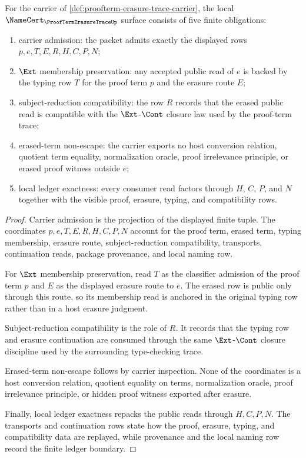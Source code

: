 \begin{theorem}
\label{thm:proofterm-erasure-trace-namecert-obligations}
For the carrier of \autoref{def:proofterm-erasure-trace-carrier}, the local $\NameCert_{\ProofTermErasureTraceUp}$ surface consists of five finite obligations:
\begin{enumerate}
\item carrier admission: the packet admits exactly the displayed rows $p,e,T,E,R,H,C,P,N$;
\item $\Ext$ membership preservation: any accepted public read of $e$ is backed by the typing row $T$ for the proof term $p$ and the erasure route $E$;
\item subject-reduction compatibility: the row $R$ records that the erased public read is compatible with the $\Ext$-$\Cont$ closure law used by the proof-term trace;
\item erased-term non-escape: the carrier exports no host conversion relation, quotient term equality, normalization oracle, proof irrelevance principle, or erased proof witness outside $e$;
\item local ledger exactness: every consumer read factors through $H$, $C$, $P$, and $N$ together with the visible proof, erasure, typing, and compatibility rows.
\end{enumerate}
\end{theorem}
\begin{proof}
Carrier admission is the projection of the displayed finite tuple. The coordinates $p,e,T,E,R,H,C,P,N$ account for the proof term, erased term, typing membership, erasure route, subject-reduction compatibility, transports, continuation reads, package provenance, and local naming row.

For $\Ext$ membership preservation, read $T$ as the classifier admission of the proof term $p$ and $E$ as the displayed erasure route to $e$. The erased row is public only through this route, so its membership read is anchored in the original typing row rather than in a host erasure judgment.

Subject-reduction compatibility is the role of $R$. It records that the typing row and erasure continuation are consumed through the same $\Ext$-$\Cont$ closure discipline used by the surrounding type-checking trace.

Erased-term non-escape follows by carrier inspection. None of the coordinates is a host conversion relation, quotient equality on terms, normalization oracle, proof irrelevance principle, or hidden proof witness exported after erasure.

Finally, local ledger exactness repacks the public reads through $H,C,P,N$. The transports and continuation rows state how the proof, erasure, typing, and compatibility data are replayed, while provenance and the local naming row record the finite ledger boundary.
\end{proof}

